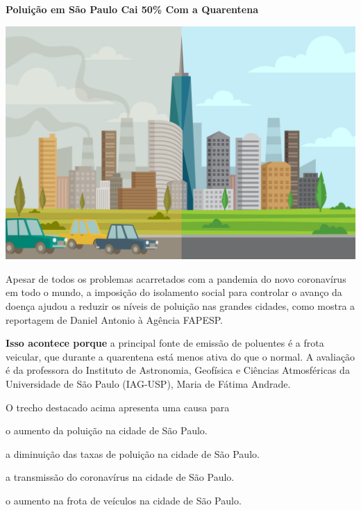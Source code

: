 \begin{myquote}
\textbf{Poluição em São Paulo Cai 50\% Com a Quarentena}

\begin{center}
\includegraphics[width=.7\textwidth]{media/image48.jpeg}
\end{center}

Apesar de todos os problemas acarretados com a pandemia do novo
coronavírus em todo o mundo, a imposição do isolamento social para
controlar o avanço da doença ajudou a reduzir os níveis de poluição nas
grandes cidades, como mostra a reportagem de Daniel Antonio à Agência
FAPESP.

\textbf{Isso acontece porque} a principal fonte de emissão de poluentes é a
frota veicular, que durante a quarentena está menos ativa do que o
normal. A avaliação é da professora do Instituto de Astronomia,
Geofísica e Ciências Atmosféricas da Universidade de São Paulo
(IAG-USP), Maria de Fátima Andrade.

\end{myquote}

\pagebreak
O trecho destacado acima apresenta uma causa para

\begin{escolha}
  \item o aumento da poluição na cidade de São Paulo.

  \item a diminuição das taxas de poluição na cidade de São Paulo.

  \item a transmissão do coronavírus na cidade de São Paulo.

  \item o aumento na frota de veículos na cidade de São Paulo.
\end{escolha}

